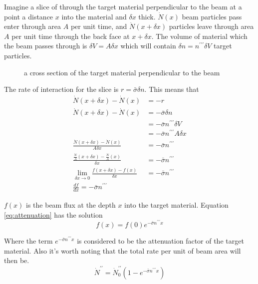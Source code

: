 Imagine a slice of through the target material perpendicular to the beam at a point a distance $x$ into the material and $\delta x$ thick.
$\dot{N}(x)$ beam particles pass enter through area $A$ per unit time, and $\dot{N}(x+\delta x)$ particles leave through area $A$ per unit time through the back face at $x+\delta x$.
The volume of material which the beam passes through is $\delta V=A \delta x$ which will contain $\delta n = n^{\prime\prime\prime}\delta V$ target particles.
\begin{figure}[h]
  \centering

\caption{a cross section of the target material perpendicular to the beam} \label{fig:attenuation}
\end{figure}
The rate of interaction for the slice is $r=\bar{\sigma} \delta n$. This means that
\begin{subequations}
\begin{align}
\dot{N}(x+\delta x) - \dot{N}(x) &=-r\\
\dot{N}(x+\delta x) - \dot{N}(x) &=-\bar{\sigma} \delta n\\
 &=-\bar{\sigma} n^{\prime\prime\prime} \delta V\\
 &=-\bar{\sigma} n^{\prime\prime\prime} A \delta x\\
 \frac{\dot{N}(x+\delta x) - \dot{N}(x)}{A \delta x} &= -\bar{\sigma} n^{\prime\prime\prime}\\
 \frac{\frac{\dot{N}}{A}(x+\delta x) - \frac{\dot{N}}{A}(x)}{\delta x} &= -\bar{\sigma} n^{\prime\prime\prime} \\
\lim_{\delta x \to 0} \frac{f(x+\delta x) - f(x)}{\delta x} &= -\bar{\sigma} n^{\prime\prime\prime}\\
\frac{df}{dx} = -\bar{\sigma} n^{\prime\prime\prime} \label{eq:attenuation}
\end{align}
\end{subequations}

$f(x)$ is the beam flux at the depth $x$ into the target material. Equation \ref{eq:attenuation} has the solution
\begin{equation}
  \label{eq:attenuation_solution}
f(x)=f(0)e^{-\bar{\sigma}n^{\prime\prime\prime}x}
\end{equation}

Where the term $e^{-\bar{\sigma}n^{\prime\prime\prime}x}$ is considered to be the attenuation factor of the target material. Also it's worth noting that the total rate per unit of beam area will then be.
\begin{equation}
  \label{eq:total_rate}
\dot{N}^{\prime\prime}=\dot{N}^{\prime\prime}_0 (1-e^{-\bar{\sigma}n^{\prime\prime\prime}x})
\end{equation}
